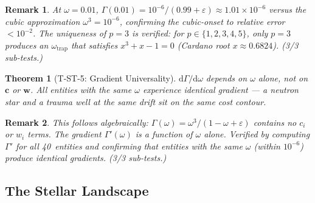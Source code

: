 \documentclass[
  aps,
  prd,
  twocolumn,
  superscriptaddress,
  nofootinbib,
  floatfix
]{revtex4-2}
\newtheorem{theorem}{Theorem}
\newtheorem{remark}{Remark}
\newcommand{\Gam}{\Gamma}
\newcommand{\eps}{\varepsilon}
\newcommand{\dd}{\mathrm{d}}
\newcommand{\tvec}{\mathbf{c}}
\newcommand{\wvec}{\mathbf{w}}
\begin{document}
\begin{remark}
At $\omega = 0.01$, $\Gam(0.01) = 10^{-6}/(0.99 + \eps)
\approx 1.01 \times 10^{-6}$ versus the cubic approximation
$\omega^3 = 10^{-6}$, confirming the cubic-onset to
relative error $< 10^{-2}$.  The uniqueness of $p = 3$
is verified: for $p \in \{1, 2, 3, 4, 5\}$, only $p = 3$
produces an $\omega_{\mathrm{trap}}$ that satisfies
$x^3 + x - 1 = 0$ (Cardano root $x \approx 0.6824$).
(3/3 sub-tests.)
\end{remark}

\begin{theorem}[T-ST-5: Gradient Universality]\label{thm:T5}
$\dd\Gam/\dd\omega$ depends on $\omega$ alone, not on
$\tvec$ or $\wvec$.  All entities with the same $\omega$
experience identical gradient --- a neutron star and a
trauma well at the same drift sit on the same cost contour.
\end{theorem}

\begin{remark}
This follows algebraically: $\Gam(\omega) = \omega^3/
(1 - \omega + \eps)$ contains no $c_i$ or $w_i$
terms.  The gradient $\Gam'(\omega)$ is a function of
$\omega$ alone.  Verified by computing $\Gam'$ for all
40~entities and confirming that entities with the same
$\omega$ (within $10^{-6}$) produce identical gradients.
(3/3 sub-tests.)
\end{remark}

\subsection{The Stellar Landscape}
\end{document}

